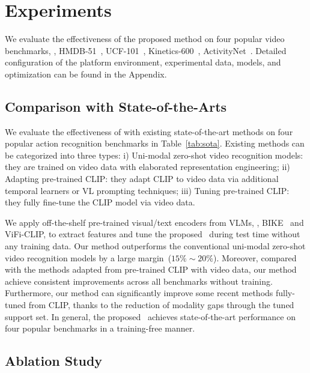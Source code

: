 \section{Experiments}
\label{experiment}
We evaluate the effectiveness of the proposed method on four popular video benchmarks, \ie, HMDB-51~\cite{kuehne2011hmdb}, UCF-101~\cite{soomro2012ucf101dataset101human}, Kinetics-600~\cite{carreira2018shortnotekinetics600}, ActivityNet~\cite{caba2015activitynet}. Detailed configuration of the platform environment, experimental data, models, and optimization can be found in the Appendix.


\subsection{Comparison with State-of-the-Arts}
{

We evaluate the effectiveness of \testv with existing state-of-the-art methods on four popular action recognition benchmarks in Table~\ref{tab:sota}. Existing methods can be categorized into three types: 
i) Uni-modal zero-shot video recognition models: they are trained on video data with elaborated representation engineering;
ii) Adapting pre-trained CLIP: they adapt CLIP to video data via additional temporal learners or VL prompting techniques;
iii) Tuning pre-trained CLIP: they fully fine-tune the CLIP model via video data.

We apply off-the-shelf pre-trained visual/text encoders from VLMs, \eg, BIKE~\cite{wu2023bidirectional} and ViFi-CLIP, to extract features and tune the proposed \testv~during test time without any training data. Our method outperforms the conventional uni-modal zero-shot video recognition models by a large margin~($15\%\sim 20\%$). Moreover, compared with the methods adapted from pre-trained CLIP with video data, our method achieve consistent improvements across all benchmarks without training. Furthermore, our method can significantly improve some recent methods fully-tuned from CLIP, thanks to the reduction of modality gaps through the tuned support set. In general, the proposed \testv~achieves state-of-the-art performance on four popular benchmarks in a training-free manner.


}


\subsection{Ablation Study}
